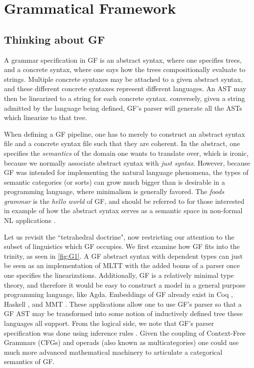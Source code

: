 \section{Grammatical Framework}

\subsection{Thinking about GF}

A grammar specification in GF is an abstract syntax, where one specifies trees,
and a concrete syntax, where one says how the trees compositionally evaluate to
strings. Multiple concrete syntaxes may be attached to a given abstract syntax,
and these different concrete syntaxes represent different languages. An AST may
then be linearized to a string for each concrete syntax. conversely, given a
string admitted by the language being defined, GF's parser will generate all the
ASTs which linearize to that tree.

When defining a GF pipeline, one has to merely to construct an abstract syntax
file and a concrete syntax file such that they are coherent. In the abstract,
one specifies the \emph{semantics} of the domain one wants to translate over,
which is ironic, because we normally associate abstract syntax with \emph{just
syntax}. However, because GF was intended for implementing the natural language
phenomena, the types of semantic categories (or sorts) can grow much bigger than
is desirable in a programming language, where minimalism is generally favored.
The \emph{foods grammar} is the \emph{hello world} of GF, and should be referred
to for those interested in example of how the abstract syntax serves as a
semantic space in non-formal NL applications \cite{ranta2011grammatical}.

Let us revisit the ``tetrahedral doctrine", now restricting our attention to the
subset of linguistics which GF occupies. We first examine how GF fits into the
trinity, as seen in \autoref{fig:G1}. A GF abstract syntax with dependent types
can just be seen as an implementation of MLTT with the added bonus of a parser
once one specifies the linearizations. Additionally, GF is a relatively minimal
type theory, and therefore it would be easy to construct a model in a general
purpose programming language, like Agda. Embeddings of GF already exist in Coq
\cite{bernardy-chatzikyriakidis-2017-type}, Haskell \cite{angelov2010pgf}, and
MMT \cite{Kohlhase_2019}. These applications allow one to use GF's parser so
that a GF AST may be transformed into some notion of inductively defined tree
these languages all support. From the logical side, we note that GF's parser
specification was done using inference rules \cite{angelov2010phd}. Given the
coupling of Context-Free Grammars (CFGs) and operads (also known as
multicategories) \cite{lambek1989multicategories} \cite{705656} one could use
much more advanced mathematical machinery to articulate a categorical semantics
of GF.


